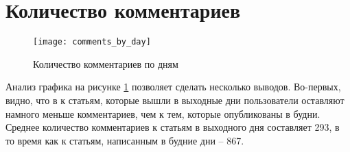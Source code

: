 \section{Количество комментариев}
\begin{figure}[h!]
	\centering
    \texttt{[image: comments\_by\_day]}
    \caption{Количество комментариев по дням}
    \label{fig:comments_by_day}
\end{figure}

Анализ графика на рисунке \ref{fig:comments_by_day} позволяет сделать несколько выводов. Во-первых, видно, что в к статьям, которые вышли в выходные дни пользователи оставляют намного меньше комментариев, чем к тем, которые опубликованы в будни. Среднее количество комментариев к статьям в выходного дня составляет 293, в то время как к статьям, написанным в будние дни -- 867.


